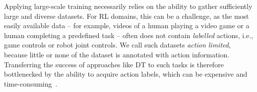 \documentclass{article} %
\newcommand{\ofir}[1]{{\color{blue} Ofir: #1}}
\begin{document}
Applying large-scale training necessarily relies on the ability to gather sufficiently large and diverse  datasets. For RL domains, this can be a challenge, as
the most easily available data -- for example, videos of a human playing a video game or a human completing a predefined task -- often does not contain \emph{labelled} actions, i.e., game controls or robot joint controls.
We call such datasets \emph{action limited}, because little or none of the dataset is annotated with action information.
Transferring the success of approaches like DT to such tasks is therefore bottlenecked by the ability to acquire action labels, which can be expensive and time-consuming~\citep{https://doi.org/10.48550/arxiv.2011.13885}. 

\end{document}
